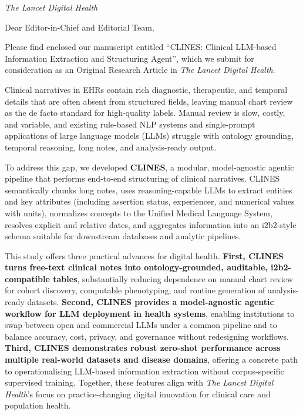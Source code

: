 \documentclass[12pt]{letter}
\begin{document}
	
	\begin{letter}{\textit{The Lancet Digital Health}}
		
		\opening{Dear Editor-in-Chief and Editorial Team,}
		
		Please find enclosed our manuscript entitled ``CLINES: Clinical LLM-based Information Extraction and Structuring Agent'', which we submit for consideration as an Original Research Article in \textit{The Lancet Digital Health}.
		
		Clinical narratives in EHRs contain rich diagnostic, therapeutic, and temporal details that are often absent from structured fields, leaving manual chart review as the de facto standard for high-quality labels. Manual review is slow, costly, and variable, and existing rule-based NLP systems and single-prompt applications of large language models (LLMs) struggle with ontology grounding, temporal reasoning, long notes, and analysis-ready output.
		
		To address this gap, we developed \textbf{CLINES}, a modular, model-agnostic agentic pipeline that performs end-to-end structuring of clinical narratives. CLINES semantically chunks long notes, uses reasoning-capable LLMs to extract entities and key attributes (including assertion status, experiencer, and numerical values with units), normalizes concepts to the Unified Medical Language System, resolves explicit and relative dates, and aggregates information into an i2b2-style schema suitable for downstream databases and analytic pipelines.
		
		This study offers three practical advances for digital health. \textbf{First, CLINES turns free-text clinical notes into ontology-grounded, auditable, i2b2-compatible tables}, substantially reducing dependence on manual chart review for cohort discovery, computable phenotyping, and routine generation of analysis-ready datasets. \textbf{Second, CLINES provides a model-agnostic agentic workflow for LLM deployment in health systems}, enabling institutions to swap between open and commercial LLMs under a common pipeline and to balance accuracy, cost, privacy, and governance without redesigning workflows. \textbf{Third, CLINES demonstrates robust zero-shot performance across multiple real-world datasets and disease domains}, offering a concrete path to operationalising LLM-based information extraction without corpus-specific supervised training. Together, these features align with \textit{The Lancet Digital Health}'s focus on practice-changing digital innovation for clinical care and population health.
		

\end{letter}
\end{document}

